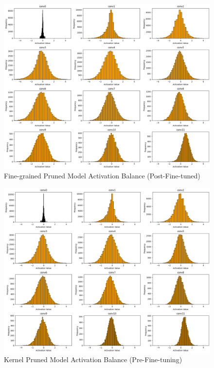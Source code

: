 \documentclass[12pt]{article}
\begin{document}
\begin{figure}[h]
  \centering
  \includegraphics[width=1\linewidth]{report_images/fine_act_ft.png}
  \caption{\label{fig:fine_act_dist_ft}Fine-grained Pruned Model Activation Balance (Post-Fine-tuned)}
\end{figure}
\FloatBarrier

\begin{figure}[h]
  \centering
  \includegraphics[width=1\linewidth]{report_images/kernel_act_pp.png}
  \caption{\label{fig:kernel_act_dist_pp}Kernel Pruned Model Activation Balance (Pre-Fine-tuning)}
\end{figure}
\FloatBarrier
\end{document}
